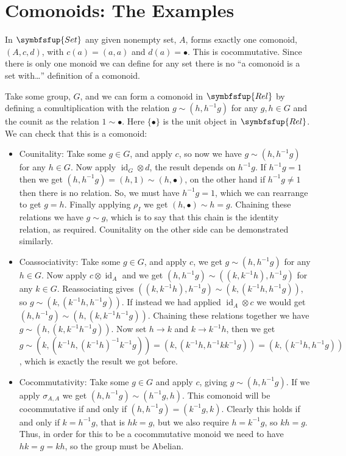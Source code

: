 \documentclass[fleqn]{NotesClass}
\makeatletter
\newcommand{\c@egory}[1]{\symbfsfup{#1}}
\newcommand{\Set}{\c@egory{Set}}
\newcommand{\Rel}{\c@egory{Rel}}
\DeclareMathOperator{\id}{id}
\makeatother
\begin{document}
    \section{Comonoids: The Examples}
    In \(\Set\) any given nonempty set, \(A\), forms exactly one comonoid, \((A, c, d)\), with \(c(a) = (a, a)\) and \(d(a) = \bullet\).
    This is cocommutative.
    Since there is only one monoid we can define for any set there is no \enquote{a comonoid is a set with\dots} definition of a comonoid.
    
    Take some group, \(G\), and we can form a comonoid in \(\Rel\) by defining a comultiplication with the relation \(g \sim (h, h^{-1}g)\) for any \(g, h \in G\) and the counit as the relation \(1 \sim \bullet\).
    Here \(\{\bullet\}\) is the unit object in \(\Rel\).
    We can check that this is a comonoid:
    \begin{itemize}
        \item Counitality: Take some \(g \in G\), and apply \(c\), so now we have \(g \sim (h, h^{-1}g)\) for any \(h \in G\).
        Now apply \({\id_G} \otimes d\), the result depends on \(h^{-1}g\).
        If \(h^{-1}g = 1\) then we get \((h, h^{-1}g) = (h, 1) \sim (h, \bullet)\), on the other hand if \(h^{-1}g \ne 1\) then there is no relation.
        So, we must have \(h^{-1}g = 1\), which we can rearrange to get \(g = h\).
        Finally applying \(\rho_I\) we get \((h, \bullet) \sim h = g\).
        Chaining these relations we have \(g \sim g\), which is to say that this chain is the identity relation, as required.
        Counitality on the other side can be demonstrated similarly.
        \item Coassociativity: Take some \(g \in G\), and apply \(c\), we get \(g \sim (h, h^{-1}g)\) for any \(h \in G\).
        Now apply \(c \otimes \id_A\) and we get \((h, h^{-1}g) \sim ((k, k^{-1}h), h^{-1}g)\) for any \(k \in G\).
        Reassociating gives \(((k, k^{-1}h), h^{-1}g) \sim (k, (k^{-1}h, h^{-1}g))\), so \(g \sim (k, (k^{-1}h, h^{-1}g))\).
        If instead we had applied \({\id_A} \otimes c\) we would get \((h, h^{-1}g) \sim (h, (k, k^{-1}h^{-1}g))\).
        Chaining these relations together we have \(g \sim (h, (k, k^{-1}h^{-1}g))\).
        Now set \(h \to k\) and \(k \to k^{-1}h\), then we get \(g \sim (k, (k^{-1}h, (k^{-1}h)^{-1}k^{-1}g)) = (k, (k^{-1}h, h^{-1}kk^{-1}g)) = (k, (k^{-1}h, h^{-1}g))\), which is exactly the result we got before.
        \item Cocommutativity: Take some \(g \in G\) and apply \(c\), giving \(g \sim (h, h^{-1}g)\).
        If we apply \(\sigma_{A,A}\) we get \((h, h^{-1}g) \sim (h^{-1}g, h)\).
        This comonoid will be cocommutative if and only if \((h, h^{-1}g) = (k^{-1}g, k)\).
        Clearly this holds if and only if \(k = h^{-1}g\), that is \(hk = g\), but we also require \(h = k^{-1}g\), so \(kh = g\).
        Thus, in order for this to be a cocommutative monoid we need to have \(hk = g = kh\), so the group must be Abelian.
    \end{itemize}
    
\end{document}

